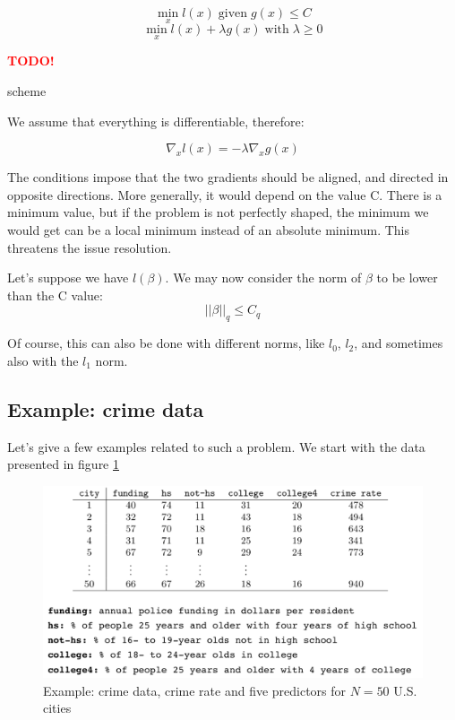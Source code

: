 \documentclass[a4paper]{tufte-book}
\newcommand{\TODO}{\textcolor{red}{\bf TODO!}\xspace}
\begin{document}
\begin{equation}
    \min_x l(x) \; \text{given} \; g(x)\leq C
\end{equation}
\begin{equation}
    \min_x l(x) + \lambda g(x) \; \text{with} \; \lambda \geq 0
\end{equation}

\begin{marginfigure}
    \TODO
    \caption{scheme}
    \label{fig3}
\end{marginfigure}

We assume that everything is differentiable, therefore:

\begin{equation}
    \nabla_x l(x) = -\lambda \nabla_x g(x)
\end{equation}

The conditions impose that the two gradients should be aligned, and directed
in opposite directions. More generally, it would depend on the value C.
There is a minimum value, but if the problem is not perfectly shaped, the
minimum we would get can be a local minimum instead of an absolute minimum. This
threatens the issue resolution.

Let's suppose we have $l(\beta)$. We may now consider the norm of $\beta$ to be
lower than the C value:
\begin{equation}
    ||\beta||_q \leq C_q
\end{equation}

Of course, this can also be done with different norms, like $l_0$, $l_2$,
and sometimes also with the $l_1$ norm.

\subsection{Example: crime data}

Let's give a few examples related to such a problem. We start with the data
presented in figure \ref{crime}

\begin{figure}
    \includegraphics{./Figures/crime.png}
    \caption{Example: crime data, crime rate and five predictors for $N=50$ U.S.
    cities}
    \label{crime}
\end{figure}
\end{document}
